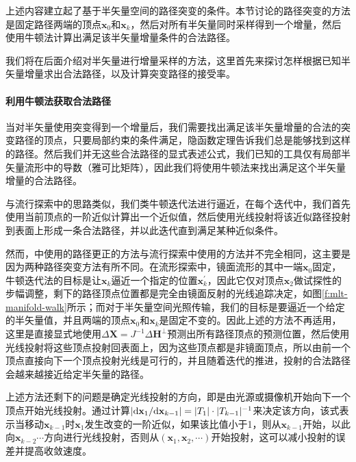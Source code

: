 上述内容建立起了基于半矢量空间的路径突变的条件。本节讨论的路径突变的方法是固定路径两端的顶点$\mathbf{x}_0$和$\mathbf{x}_k$，然后对所有半矢量同时采样得到一个增量，然后使用牛顿法计算出满足该半矢量增量条件的合法路径。

我们将在后面介绍对半矢量进行增量采样的方法，这里首先来探讨怎样根据已知半矢量增量求出合法路径，以及计算突变路径的接受率。




\paragraph{利用牛顿法获取合法路径}
当对半矢量使用突变得到一个增量后，我们需要找出满足该半矢量增量的合法的突变路径的顶点，只要局部约束的条件满足，隐函数定理告诉我们总是能够找到这样的路径。然后我们并无这些合法路径的显式表述公式，我们已知的工具仅有局部半矢量流形中的导数（雅可比矩阵），因此我们将使用牛顿法来找出满足这个半矢量增量的合法路径。

与流行探索\cite{a:ManifoldExplorationAMarkovChainMonteCarloTechniqueforRenderingSceneswithDifficultSpecularTransport}中的思路类似，我们类牛顿迭代法进行逼近，在每个迭代中，我们首先使用当前顶点的一阶近似计算出一个近似值，然后使用光线投射将该近似路径投射到表面上形成一条合法路径，并以此迭代直到满足某种近似条件。

然而，\cite{a:TheNaturalConstraintRepresentationofthePathSpaceforEfficientLightTransportSimulation}中使用的路径更正的方法与流行探索中使用的方法并不完全相同，这主要是因为两种路径突变方法有所不同。在流形探索中，镜面流形的其中一端$\mathbf{x}_0$固定，牛顿迭代法的目标是让$\mathbf{x}_k$逼近一个指定的位置$\mathbf{x}^{'}_{k}$，因此它仅对顶点$\mathbf{x}_2$做试探性的步幅调整，剩下的路径顶点位置都是完全由镜面反射的光线追踪决定，如图\ref{f:mlt-manifold-walk}所示；而对于半矢量空间光照传输，我们的目标是要逼近一个给定的半矢量值，并且两端的顶点$\mathbf{x}_0$和$\mathbf{x}_k$是固定不变的。因此上述的方法不再适用，这里是直接显式地使用$\Delta\mathbf{X}=J^{-1}\Delta\mathbf{H}^{\perp}$预测出所有路径顶点的预测位置，然后使用光线投射将这些顶点投射回表面上，因为这些顶点都是非镜面顶点，所以由前一个顶点直接向下一个顶点投射光线是可行的，并且随着迭代的推进，投射的合法路径会越来越接近给定半矢量的路径。

上述方法还剩下的问题是确定光线投射的方向，即是由光源或摄像机开始向下一个顶点开始光线投射。\cite{a:TheNaturalConstraintRepresentationofthePathSpaceforEfficientLightTransportSimulation}通过计算$|{\rm d}\mathbf{x}_1/{\rm d}\mathbf{x}_{k-1}|=|T_1|\cdot|T_{k-1}|^{-1}$来决定该方向，该式表示当移动$\mathbf{x}_{k-1}$时$\mathbf{x}_1$发生改变的一阶近似，如果该比值小于1，则从$\mathbf{x}_{k-1}$开始，以此向$\mathbf{x}_{k-2}\cdots$方向进行光线投射，否则从$(\mathbf{x}_1,\mathbf{x}_2,\cdots)$开始投射，这可以减小投射的误差并提高收敛速度。


